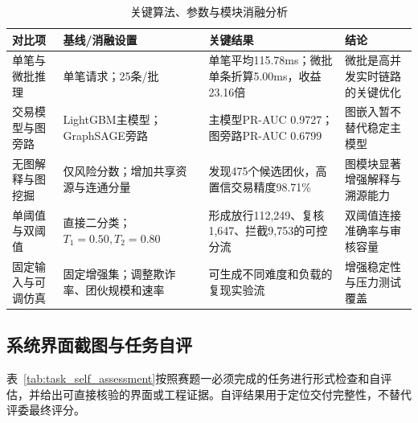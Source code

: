\begin{table}[H]
  \centering
  \caption{关键算法、参数与模块消融分析}
  \label{tab:ablation_analysis}
  \renewcommand\arraystretch{1.32}
  \setlength{\tabcolsep}{4pt}
  {\songti{}
  \begin{tabularx}{0.98\textwidth}{>{\raggedright\arraybackslash}p{2.4cm}>{\raggedright\arraybackslash}p{3.0cm}>{\raggedright\arraybackslash}X>{\raggedright\arraybackslash}p{3.0cm}}
    \toprule
    对比项 & 基线/消融设置 & 关键结果 & 结论 \\
    \midrule
    单笔与微批推理 & 单笔请求；25条/批 & 单笔平均115.78ms；微批单条折算5.00ms，收益23.16倍 & 微批是高并发实时链路的关键优化 \\
    交易模型与图旁路 & LightGBM主模型；GraphSAGE旁路 & 主模型PR-AUC 0.9727；图旁路PR-AUC 0.6799 & 图嵌入暂不替代稳定主模型 \\
    无图解释与图挖掘 & 仅风险分数；增加共享资源与连通分量 & 发现475个候选团伙，高置信交易精度98.71\% & 图模块显著增强解释与溯源能力 \\
    单阈值与双阈值 & 直接二分类；$T_1=0.50,T_2=0.80$ & 形成放行112,249、复核1,647、拦截9,753的可控分流 & 双阈值连接准确率与审核容量 \\
    固定输入与可调仿真 & 固定增强集；调整欺诈率、团伙规模和速率 & 可生成不同难度和负载的复现实验流 & 增强稳定性与压力测试覆盖 \\
    \bottomrule
  \end{tabularx}}
\end{table}

\subsection{系统界面截图与任务自评}

表~\ref{tab:task_self_assessment}按照赛题一必须完成的任务进行形式检查和自评估，并给出可直接核验的界面或工程证据。自评结果用于定位交付完整性，不替代评委最终评分。

